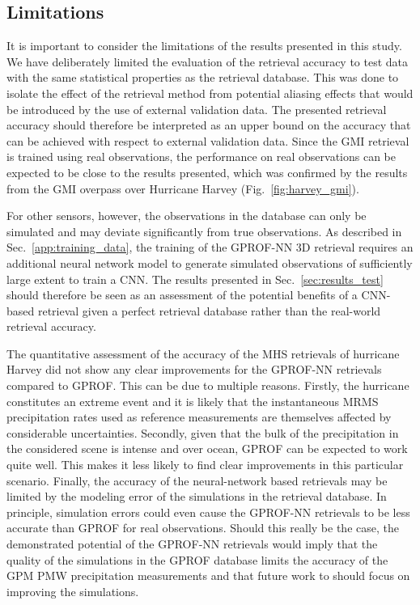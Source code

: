 \documentclass[journal abbreviation, manuscript]{copernicus}
\begin{document}
\subsection{Limitations}

It is important to consider the limitations of the results presented in this
study. We have deliberately limited the evaluation of the retrieval accuracy to
test data with the same statistical properties as the retrieval database. This
was done to isolate the effect of the retrieval method from potential aliasing
effects that would be introduced by the use of external validation data. The
presented retrieval accuracy should therefore be interpreted as an upper bound
on the accuracy that can be achieved with respect to external validation data.
Since the GMI retrieval is trained using real observations, the performance on
real observations can be expected to be close to the results presented, which
was confirmed by the results from the GMI overpass over Hurricane Harvey
(Fig.~\ref{fig:harvey_gmi}).

For other sensors, however, the observations in the database can only be
simulated and may deviate significantly from true observations. As described in
Sec.~\ref{app:training_data}, the training of the GPROF-NN 3D retrieval requires
an additional neural network model to generate simulated observations of
sufficiently large extent to train a CNN. The results presented in
Sec.~\ref{sec:results_test} should therefore be seen as an assessment of the
potential benefits of a CNN-based retrieval given a perfect retrieval database
rather than the real-world retrieval accuracy.

The quantitative assessment of the accuracy of the MHS retrievals of hurricane
Harvey did not show any clear improvements for the GPROF-NN retrievals compared
to GPROF. This can be due to multiple reasons. Firstly, the hurricane
constitutes an extreme event and it is likely that the instantaneous MRMS
precipitation rates used as reference measurements are themselves affected by
considerable uncertainties. Secondly, given that the bulk of the precipitation
in the considered scene is intense and over ocean, GPROF can be expected to work
quite well. This makes it less likely to find clear improvements in this
particular scenario. Finally, the accuracy of the neural-network based
retrievals may be limited by the modeling error of the simulations in the
retrieval database. In principle, simulation errors could even cause the
GPROF-NN retrievals to be less accurate than GPROF for real observations. Should
this really be the case, the demonstrated potential of the GPROF-NN retrievals
would imply that the quality of the simulations in the GPROF database limits the
accuracy of the GPM PMW precipitation measurements and that future work to
should focus on improving the simulations.
\end{document}
